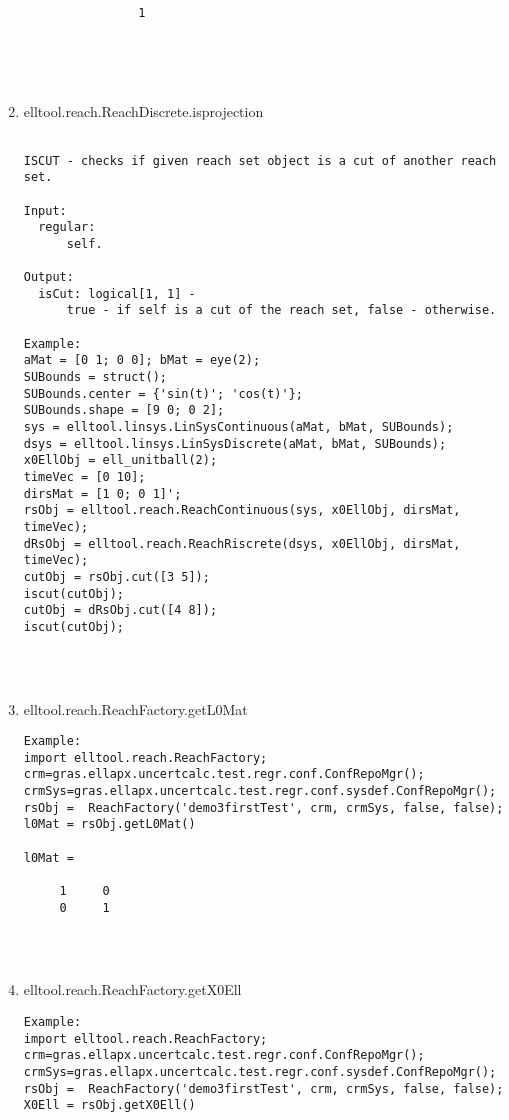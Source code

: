 \begin{enumerate}
\begin{lstlisting}
                1





\end{lstlisting}
\fontfamily{\familydefault}
\selectfont
\item {elltool.reach.ReachDiscrete.isprojection}
\selectfont
\begin{lstlisting}

ISCUT - checks if given reach set object is a cut of another reach set.

Input:
  regular:
      self.

Output:
  isCut: logical[1, 1] -
      true - if self is a cut of the reach set, false - otherwise.

Example:
aMat = [0 1; 0 0]; bMat = eye(2);
SUBounds = struct();
SUBounds.center = {'sin(t)'; 'cos(t)'};
SUBounds.shape = [9 0; 0 2];
sys = elltool.linsys.LinSysContinuous(aMat, bMat, SUBounds);
dsys = elltool.linsys.LinSysDiscrete(aMat, bMat, SUBounds);
x0EllObj = ell_unitball(2);
timeVec = [0 10];
dirsMat = [1 0; 0 1]';
rsObj = elltool.reach.ReachContinuous(sys, x0EllObj, dirsMat, timeVec);
dRsObj = elltool.reach.ReachRiscrete(dsys, x0EllObj, dirsMat, timeVec);
cutObj = rsObj.cut([3 5]);
iscut(cutObj);
cutObj = dRsObj.cut([4 8]);
iscut(cutObj);




\end{lstlisting}
\fontfamily{\familydefault}
\selectfont
\item {elltool.reach.ReachFactory.getL0Mat}
\selectfont
\begin{lstlisting}
Example:
import elltool.reach.ReachFactory;
crm=gras.ellapx.uncertcalc.test.regr.conf.ConfRepoMgr();
crmSys=gras.ellapx.uncertcalc.test.regr.conf.sysdef.ConfRepoMgr();
rsObj =  ReachFactory('demo3firstTest', crm, crmSys, false, false);
l0Mat = rsObj.getL0Mat()

l0Mat =

     1     0
     0     1




\end{lstlisting}
\fontfamily{\familydefault}
\selectfont
\item {elltool.reach.ReachFactory.getX0Ell}
\selectfont
\begin{lstlisting}
Example:
import elltool.reach.ReachFactory;
crm=gras.ellapx.uncertcalc.test.regr.conf.ConfRepoMgr();
crmSys=gras.ellapx.uncertcalc.test.regr.conf.sysdef.ConfRepoMgr();
rsObj =  ReachFactory('demo3firstTest', crm, crmSys, false, false);
X0Ell = rsObj.getX0Ell()


\end{lstlisting}
\end{enumerate}
